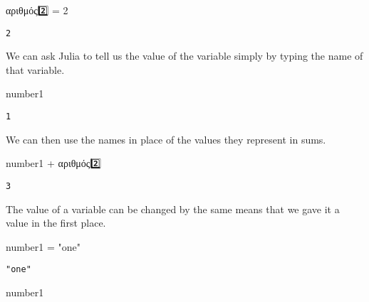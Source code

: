 \documentclass[
  letterpaper,
  DIV=11,
  numbers=noendperiod]{scrreprt}
\newenvironment{Shaded}{\begin{snugshade}}{\end{snugshade}}
\newcommand{\FloatTok}[1]{\textcolor[rgb]{0.68,0.00,0.00}{#1}}
\newcommand{\NormalTok}[1]{\textcolor[rgb]{0.00,0.23,0.31}{#1}}
\newcommand{\OperatorTok}[1]{\textcolor[rgb]{0.37,0.37,0.37}{#1}}
\newcommand{\StringTok}[1]{\textcolor[rgb]{0.13,0.47,0.30}{#1}}
\begin{document}
\begin{Shaded}
\begin{Highlighting}[]
\NormalTok{αριθμός}\FloatTok{2}\NormalTok{️⃣ }\OperatorTok{=} \FloatTok{2}
\end{Highlighting}
\end{Shaded}

\begin{verbatim}
2
\end{verbatim}

We can ask Julia to tell us the value of the variable simply by typing
the name of that variable.

\begin{Shaded}
\begin{Highlighting}[]
\NormalTok{number1}
\end{Highlighting}
\end{Shaded}

\begin{verbatim}
1
\end{verbatim}

We can then use the names in place of the values they represent in sums.

\begin{Shaded}
\begin{Highlighting}[]
\NormalTok{number1 }\OperatorTok{+}\NormalTok{ αριθμός}\FloatTok{2}\NormalTok{️⃣}
\end{Highlighting}
\end{Shaded}

\begin{verbatim}
3
\end{verbatim}

The value of a variable can be changed by the same means that we gave it
a value in the first place.

\begin{Shaded}
\begin{Highlighting}[]
\NormalTok{number1 }\OperatorTok{=} \StringTok{"one"}
\end{Highlighting}
\end{Shaded}

\begin{verbatim}
"one"
\end{verbatim}

\begin{Shaded}
\begin{Highlighting}[]
\NormalTok{number1}
\end{Highlighting}
\end{Shaded}
\end{document}
